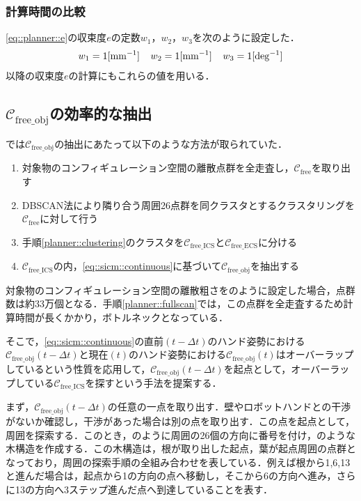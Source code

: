 \documentclass[a4paper,twoside,12pt,papersize, dvipdfmx]{iirthesis}
\begin{document}
\subsubsection{計算時間の比較}
\eqref{eq::planner::e}の収束度$e$の定数$w_1$，$w_2$，$w_3$を次のように設定した．
\begin{gather}
\notag
w_1=1 \mathrm{[mm^{-1}]} \;\;\;\; w_2=1 \mathrm{[mm^{-1}]} \;\;\;\; w_3=1 \mathrm{[deg^{-1}]}
\end{gather}
以降の収束度$e$の計算にもこれらの値を用いる．


\subsection{$\mathcal{C}_{\mathrm{free\_obj}}$の効率的な抽出}\label{subsec::planner::dfs}
\cite{komiyama2021}では$\mathcal{C}_{\mathrm{free\_obj}}$の抽出にあたって以下のような方法が取られていた．
\begin{enumerate}
\item 対象物のコンフィギュレーション空間の離散点群を全走査し，$\mathcal{C}_{\mathrm{free}}$を取り出す \label{planner::fullscan}
\item DBSCAN法\cite{ester1996}により隣り合う周囲26点群を同クラスタとするクラスタリングを$\mathcal{C}_{\mathrm{free}}$に対して行う\label{planner::clustering}
\item 手順\ref{planner::clustering}のクラスタを$\mathcal{C}_{\mathrm{free\_ICS}}$と$\mathcal{C}_{\mathrm{free\_ECS}}$に分ける
\item $\mathcal{C}_{\mathrm{free\_ICS}}$の内，\eqref{eq::sicm::continuous}に基づいて$\mathcal{C}_{\mathrm{free\_obj}}$を抽出する
\end{enumerate}
対象物のコンフィギュレーション空間の離散粗さをのように設定した場合，点群数は約33万個となる．手順\ref{planner::fullscan}では，この点群を全走査するため計算時間が長くかかり，ボトルネックとなっている．\par

そこで，\eqref{eq::sicm::continuous}の直前$(t-\Delta t)$のハンド姿勢における$\mathcal{C}_{\mathrm{free\_obj}}(t-\Delta t)$と現在$(t)$のハンド姿勢における$\mathcal{C}_{\mathrm{free\_obj}}(t)$はオーバーラップしているという性質を応用して，$\mathcal{C}_{\mathrm{free\_obj}}(t-\Delta t)$を起点として，オーバーラップしている$\mathcal{C}_{\mathrm{free\_ICS}}$を探すという手法を提案する．\par

まず，$\mathcal{C}_{\mathrm{free\_obj}}(t-\Delta t)$の任意の一点を取り出す．壁やロボットハンドとの干渉がないか確認し，干渉があった場合は別の点を取り出す．この点を起点として，周囲を探索する．このとき，のように周囲の26個の方向に番号を付け，のような木構造を作成する．この木構造は，根が取り出した起点，葉が起点周囲の点群となっており，周囲の探索手順の全組み合わせを表している．例えば根から1,6,13と進んだ場合は，起点から1の方向の点へ移動し，そこから6の方向へ進み，さらに13の方向へ3ステップ進んだ点へ到達していることを表す．\par
\end{document}
